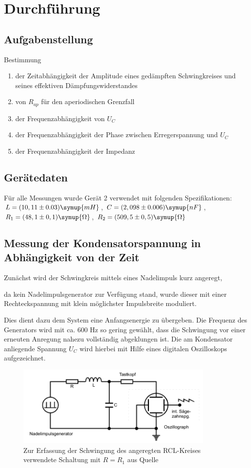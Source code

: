 \section{Durchführung}
\label{sec:Durchführung}

\subsection{Aufgabenstellung}
Bestimmung

   \begin{enumerate}
     \item der Zeitabhängigkeit der Amplitude eines gedämpften Schwingkreises
     und seines effektiven Dämpfungswiderstandes
     \item von $R_{ap}$ für den aperiodischen Grenzfall
     \item der Frequenzabhängigkeit von $U_C$
     \item der Frequenzabhängigkeit der Phase \varphi zwischen Erregerspannung
     und $U_C$
     \item der Frequenzabhängigkeit der Impedanz
   \end{enumerate}


\subsection{Gerätedaten}
Für alle Messungen wurde Gerät 2 verwendet mit folgenden Spezifikationen:\\
$L= (10,11\pm 0.03)\symup{mH}$, $C=(2,098 \pm 0.006)\symup{nF}$,
$R_1 =(48,1 \pm 0,1) \symup{\Omega}$, $R_2=(509,5 \pm 0,5)\symup{\Omega}$

\subsection{Messung der Kondensatorspannung in Abhängigkeit von der Zeit}
Zunächst wird der Schwingkreis mittels eines Nadelimpuls kurz angeregt,

da kein Nadelimpulsgenerator zur Verfügung stand, wurde dieser mit einer
Rechteckspannung mit klein möglichster Impulsbreite moduliert.

Dies dient dazu dem System eine Anfangsenergie zu übergeben. Die Frequenz des
Generators wird mit ca. 600 Hz so gering gewählt, dass die Schwingung vor einer
erneuten Anregung nahezu vollständig abgeklungen ist. Die am Kondensator
anliegende Spannung $U_C$ wird hierbei mit Hilfe eines digitalen Oszilloskops
aufgezeichnet.

\begin{figure}
  \centering
  \includegraphics[height= 4cm]{./logos/Amplitude_Schaltung.PNG}
  \caption{Zur Erfassung der Schwingung des angeregten RCL-Kreises verwendete
  Schaltung mit $R = R_1$ aus Quelle \cite{sample}}
  \label{fig:5a}
\end{figure}

